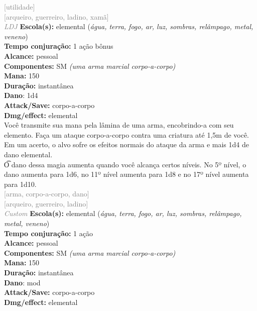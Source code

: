 \documentclass{RPG_Adventure}[2021/10/20]
\begin{document}
{\scriptsize \textcolor{gray}{[utilidade]\\}}
{\scriptsize \textcolor{gray}{[arqueiro, guerreiro, ladino, xamã]\\}}
{\tiny \textcolor{gray}{\textit{LDJ}}}\jump{}
{\small \t \textbf{Escola(s):} elemental (\textit{água, terra, fogo, ar, luz, sombras, relâmpago, metal, veneno})\\\t \textbf{Tempo conjuração:} 1 ação bônus\\\t \textbf{Alcance:} pessoal\\\t \textbf{Componentes:} SM \textit{(uma arma marcial corpo-a-corpo)}\\\t \textbf{Mana:} 150\\\t \textbf{Duração:} instantânea\\\t \textbf{Dano}: 1d4\\\t \textbf{Attack/Save:} corpo-a-corpo\\\t \textbf{Dmg/effect:} elemental\\}
{\normalsize Você transmite sua mana pela lâmina de uma arma, encobrindo-a com seu elemento. Faça um ataque corpo-a-corpo contra uma criatura até 1,5m de você. Em um acerto, o alvo sofre os efeitos normais do ataque da arma e mais 1d4 de dano elemental.\\\t O dano dessa magia aumenta quando você alcança certos níveis. No 5º nível, o dano aumenta para 1d6, no 11º nível aumenta para 1d8 e no 17º nível aumenta para 1d10.\\}
{\scriptsize \textcolor{gray}{[arma, corpo-a-corpo, dano]\\}}
{\scriptsize \textcolor{gray}{[arqueiro, guerreiro, ladino]\\}}
{\tiny \textcolor{gray}{\textit{Custom}}}\jump{}
{\small \t \textbf{Escola(s):} elemental (\textit{água, terra, fogo, ar, luz, sombras, relâmpago, metal, veneno})\\\t \textbf{Tempo conjuração:} 1 ação\\\t \textbf{Alcance:} pessoal\\\t \textbf{Componentes:} SM \textit{(uma arma marcial corpo-a-corpo)}\\\t \textbf{Mana:} 150\\\t \textbf{Duração:} instantânea\\\t \textbf{Dano}: mod\\\t \textbf{Attack/Save:} corpo-a-corpo\\\t \textbf{Dmg/effect:} elemental\\}
\end{document}
